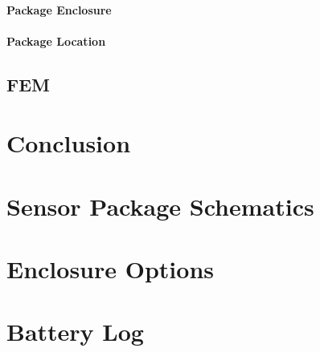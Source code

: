 \documentclass[12pt]{report}
\begin{document}
			\subsubsection{Package Enclosure}
				
			\subsubsection{Package Location}
				
	\section{FEM}
		
		
\chapter{Conclusion}
\label{ch:Collection}
	




\appendix

\chapter{Sensor Package Schematics}
\label{app:Schematic}


\chapter{Enclosure Options}
\label{app:CaseOptions}


\chapter{Battery Log}
\label{app:batterylog}

 
\end{document}
